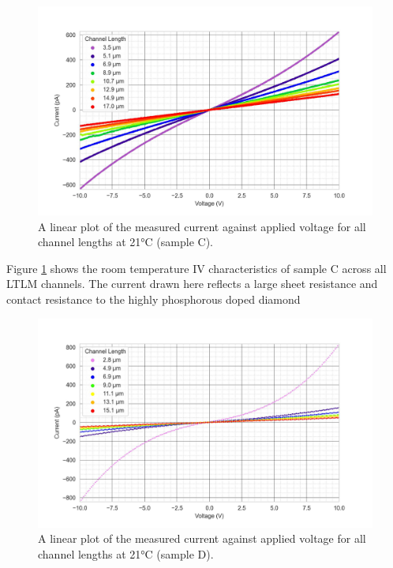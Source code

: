 \begin{refsection}
\begin{figure}[H]
    \centering
    \includegraphics[width=\textwidth]{Chapter3/Figs/Raster/Sample C 2019/IV/10V IV characteristics at 21 C.jpg}
    \caption{A linear plot of the measured current against applied voltage for all channel lengths at 21\si{\degreeCelsius} (sample C).}
    \label{fig:C_current_voltage_21}
\end{figure}
Figure \ref{fig:C_current_voltage_21} shows the room temperature IV characteristics of sample C across all LTLM channels. The current drawn here reflects a large sheet resistance and contact resistance to the highly phosphorous doped diamond
\begin{figure}[H]
    \centering
    \includegraphics[width=\textwidth]{Chapter3/Figs/Raster/Sample D 2019/IV/10V IV characteristics at 21 C.jpg}
    \caption{A linear plot of the measured current against applied voltage for all channel lengths at 21\si{\degreeCelsius} (sample D).}
    \label{fig:D_current_voltage_21_10V}

\end{figure}
\end{refsection}
